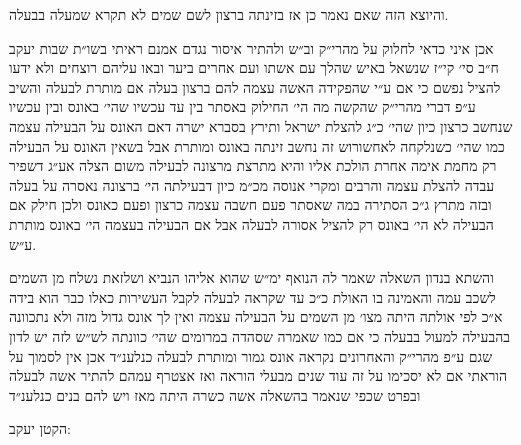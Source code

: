 \documentclass[12pt, openany]{book}
\begin{document}
\begin{multicols}{2}
והיוצא הזה שאם נאמר כן אז בזינתה ברצון לשם שמים לא תקרא שמעלה בבעלה. \\\vspace{0pt}

אכן איני כדאי לחלוק על מהרי״ק וב״ש ולהתיר איסור נגדם אמנם ראיתי בשו״ת שבות יעקב ח״ב סי׳ קי״ז שנשאל באיש שהלך עם אשתו ועם אחרים ביער ובאו עליהם רוצחים ולא ידעו להציל נפשם כי אם ע״י שהפקידה האשה עצמה להם ברצון בעלה אם מותרת לבעלה והשיב ע״פ דברי מהרי״ק שהקשה מה הי׳ החילוק באסתר בין עד עכשיו שהי׳ באונס ובין עכשיו שנחשב כרצון כיון שהי׳ כ״ג להצלת ישראל ותירץ בסברא ישרה דאם האונס על הבעילה עצמה כמו שהי׳ כשנלקחה לאחשורוש זה נחשב זינתה באונס ומותרת אבל בשאין האונס על הבעילה רק מחמת אימה אחרת הולכת אליו והיא מתרצת מרצונה לבעילה משום הצלה אע״ג דשפיר עבדה להצלת עצמה והרבים ומקרי אנוסה מכ״מ כיון דבעילתה הי׳ ברצונה נאסרה על בעלה ובזה מתרץ ג״כ הסתירה במה שאסתר פעם חשבה עצמה כרצון ופעם כאונס ולכן חילק אם הבעילה לא הי׳ באונס רק להציל אסורה לבעלה אבל אם הבעילה בעצמה הי׳ באונס מותרת ע״ש.\\\vspace{0pt}

והשתא בנדון השאלה שאמר לה הנואף ימ״ש שהוא אליהו הנביא ושלזאת נשלח מן השמים לשכב עמה והאמינה בו האולת כ״כ עד שקראה לבעלה לקבל העשירות כאלו כבר הוא בידה א״כ לפי אולתה היתה מצו׳ מן השמים על הבעילה עצמה ואין לך אונס גדול מזה ולא נתכוונה בהבעילה למעול בבעלה כי אם כמו שאמרה שסהדה במרומים שהי׳ כוונתה לש״ש לזה יש לדון שגם ע״פ מהרי״ק והאחרונים נקראה אונס גמור ומותרת לבעלה כנלענ״ד אכן אין לסמוך על הוראתי אם לא יסכימו על זה עוד שנים מבעלי הוראה ואז אצטרף עמהם להתיר אשה לבעלה ובפרט שכפי שנאמר בהשאלה אשה כשרה היתה מאז ויש להם בנים כנלענ״ד\\\vspace{0pt}

הקטן יעקב: \\\vspace{0pt}

\end{multicols}\newpage
\end{document}
